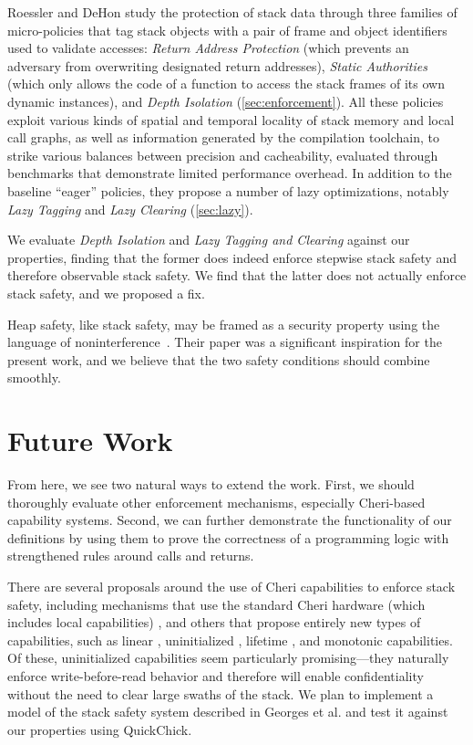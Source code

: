 \documentclass[10pt,conference]{ieeetran}%
\theoremstyle{definition}
\begin{document}
{
%
Roessler and DeHon \cite{DBLP:conf/sp/RoesslerD18}
study the protection of stack data through three families of
micro-policies that tag stack objects with a pair of frame and object identifiers
used to validate accesses: {\em Return Address Protection} (which
prevents an adversary from overwriting designated return addresses), {\em Static
Authorities} (which only allows the code of a function to access the stack frames
of its own dynamic instances), and {\em Depth Isolation}
(\cref{sec:enforcement}). All these policies exploit various kinds of spatial and
temporal locality of stack memory and local call graphs, as well as information
generated by the compilation toolchain, to strike various balances between
precision and cacheability, evaluated through benchmarks that demonstrate
limited performance overhead. In addition to the baseline ``eager'' policies,
they propose a number of lazy optimizations, notably {\em Lazy Tagging} and
{\em Lazy
Clearing} (\cref{sec:lazy}).

We evaluate {\em Depth Isolation} and {\em Lazy Tagging and Clearing}
against our properties, finding that the former does
indeed enforce stepwise stack safety and therefore observable stack
safety. We find that the latter does not actually enforce
stack safety, and we proposed a fix.

%
Heap safety, like stack safety, may be framed as a security property using
the language of
noninterference~\cite{DBLP:conf/post/AmorimHP18}. Their paper was a significant inspiration
for the present work, and we believe that the two safety conditions should
combine smoothly.

\section{Future Work}
\label{sec:future}

From here, we see two natural ways to extend the work. First, we should thoroughly evaluate
other enforcement mechanisms, especially Cheri-based capability
systems. Second, we can further demonstrate
the functionality of our definitions by using them to prove
the correctness of a programming logic with strengthened rules around calls and returns.

%
There are several proposals around the use of Cheri capabilities to enforce stack safety,
including mechanisms that use the standard Cheri hardware (which includes local
capabilities) \cite{SkorstengaardLocal},
and others that propose entirely new types of capabilities, such as linear
\cite{SkorstengaardSTK}, uninitialized \cite{Georges+21}, lifetime
\cite{Tsampas+19}, and monotonic \cite{GeorgesComplete} capabilities.
Of these, uninitialized capabilities seem particularly promising---they naturally enforce
write-before-read behavior and therefore will enable confidentiality without the need
to clear large swaths of the stack. We plan to implement a model of the stack safety
system described in Georges et al. \cite{Georges+21} and test it against our properties using
QuickChick.

}
\end{document}
